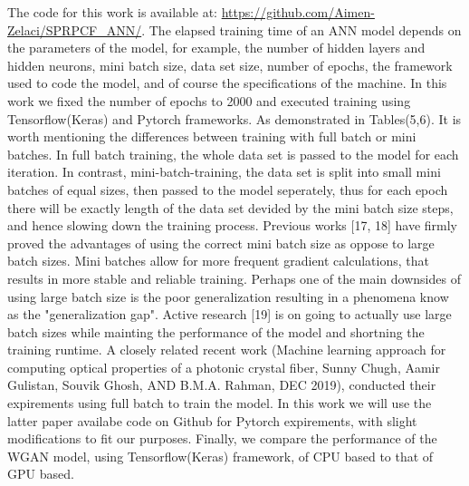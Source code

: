 \documentclass[draft, a4, 10pt, onecolumn]{IEEEtran}
\begin{document}
The code for this work is available at: \url{https://github.com/Aimen-Zelaci/SPRPCF_ANN/}.
\newline
The elapsed training time of an ANN model depends on the parameters of the model, for example, the number of hidden layers and hidden neurons, mini batch size, data set size, number of epochs, the framework used to code the model, and of course the specifications of the machine.
In this work we fixed the number of epochs to 2000 and executed training using Tensorflow(Keras) and Pytorch frameworks. As demonstrated in Tables(5,6). It is worth mentioning the differences between training with full batch or mini batches. In full batch training, the whole data set is passed to the model for each iteration. In contrast, mini-batch-training, the data set is split into small mini batches of equal sizes, then passed to the model seperately, thus for each epoch there will be exactly length  of the data set devided by the mini batch size steps, and hence slowing down the training process. Previous works [17, 18] have firmly proved the advantages of using the correct mini batch size as oppose to large batch sizes. Mini batches allow for more frequent gradient calculations, that results in more stable and reliable training. Perhaps one of the main downsides of using large batch size is the poor generalization resulting in a phenomena know as the "generalization gap". Active research [19] is on going to actually use large batch sizes while mainting the performance of the model and shortning the training runtime. A closely related recent work (Machine learning approach for computing optical properties of a photonic crystal fiber, Sunny Chugh, Aamir Gulistan, Souvik Ghosh, AND B.M.A. Rahman, DEC 2019), conducted their expirements using full batch to train the model. In this work we will use the latter paper availabe code on Github for Pytorch expirements, with slight modifications to fit our purposes. Finally, we compare the performance of the WGAN model, using Tensorflow(Keras) framework, of CPU based to that of GPU based.
\end{document}
